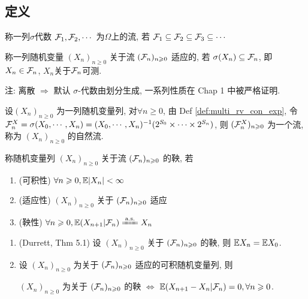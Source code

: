 \subsection{定义}

\begin{definition}[流]
    称一列$\sigma$代数 $\mathcal{F}_1,\mathcal{F}_2,\cdots$ 为$\Omega$上的流, 若 $\mathcal{F}_1\subseteq \mathcal{F}_2\subseteq \mathcal{F}_3\subseteq\cdots$
\end{definition}

\begin{definition}[适应过程]
    称一列随机变量 $(X_n)_{n\geq 0}$ 关于流 $(\mathcal{F}_n)_{n\geqslant 0}$ 适应的, 若 $\sigma(X_n)\subseteq \mathcal{F}_n$, 即 $X_n\in \mathcal{F}_n$, $X_n$关于$\mathcal{F}_n$可测.
\end{definition}
注: 离散 $\Rightarrow$ 默认 $\sigma$-代数由划分生成, 一系列性质在 Chap 1 中被严格证明.

\begin{example}[自然流]
    设$(X_n)_{n\geq 0}$ 为一列随机变量列, 对$\forall n\geq 0$, 由 Def \ref{def:multi_rv_con_exp}, 令 $\mathcal{F}_n^X=\sigma(X_0,\cdots,X_n)=(X_0,\cdots,X_n)^{-1}(2^{S_0}\times\cdots\times 2^{S_n})$, 则 $(\mathcal{F}_n^X)_{n\geqslant 0}$ 为一个流, 称为 $(X_n)_{n\geq 0}$ 的自然流.
\end{example}

\begin{definition}[离散鞅]\label{def:p140-def3}
    称随机变量列 $(X_n)_{n\geq 0}$ 关于流 $(\mathcal{F}_n)_{n\geqslant 0}$ 的鞅, 若
    \begin{enumerate}
        \item (可积性) $\forall n\geqslant 0, \mathbb E|X_n|<\infty$
        \item (适应性) $(X_n)_{n\geq 0}$ 关于 $(\mathcal{F}_n)_{n\geqslant 0}$ 适应
        \item (鞅性) $\forall n\geq 0, \EE(X_{n+1}|\CF_n)\xlongequal{\text{a.s.}}X_n$
    \end{enumerate}
\end{definition}

\begin{theorem}
    \begin{enumerate}
        \item (Durrett, Thm 5.1) 设 $(X_n)_{n\geq 0}$ 关于 $(\mathcal{F}_n)_{n\geqslant 0}$ 的鞅, 则 $\mathbb E X_n=\mathbb E X_0$.
        \item 设 $(X_n)_{n\geq 0}$ 为关于 $(\mathcal{F}_n)_{n\geqslant 0}$ 适应的可积随机变量列, 则 
        
        $(X_n)_{n\geq 0}$ 为关于 $(\mathcal{F}_n)_{n\geqslant 0}$ 的鞅 $\iff$ $\mathbb E(X_{n+1}-X_n|\mathcal{F}_n)=0,\forall n\geqslant 0$.
    \end{enumerate}
\end{theorem}

